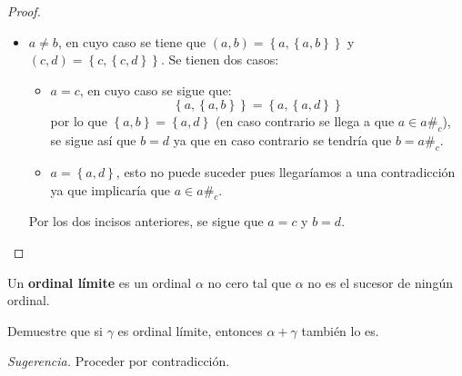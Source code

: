 \documentclass[12pt]{report}
\newcounter{it}
\theoremstyle{largebreak}
\newcommand\contradiction{\ensuremath{\#_c}}
\begin{document}
\begin{proof}
\begin{itemize}
            \item $a\neq b$, en cuyo caso se tiene que $(a,b)=\left\{a,\left\{a,b\right\}\right\}$ y $(c,d)=\left\{c,\left\{c,d\right\} \right\}$. Se tienen dos casos:
            \begin{itemize}
                \item $a=c$, en cuyo caso se sigue que:
                \begin{equation*}
                    \left\{a,\left\{a,b\right\}\right\}=\left\{a,\left\{a,d\right\} \right\}
                \end{equation*}
                por lo que $\left\{a,b\right\}=\left\{a,d \right\}$ (en caso contrario se llega a que $a\in a$\contradiction), se sigue así que $b=d$ ya que en caso contrario se tendría que $b=a$\contradiction.
                \item $a=\left\{a,d\right\}$, esto no puede suceder pues llegaríamos a una contradicción ya que implicaría que $a\in a$\contradiction.
            \end{itemize}
            Por los dos incisos anteriores, se sigue que $a=c$ y $b=d$.
        \end{itemize}
    \end{proof}

    \begin{excer}
        
    \end{excer}

    \begin{mydef}
        Un \textbf{ordinal límite} es un ordinal $\alpha$ no cero tal que $\alpha$ no es el sucesor de ningún ordinal.
    \end{mydef}

    \begin{excer}
        Demuestre que si $\gamma$ es ordinal límite, entonces $\alpha+\gamma$ también lo es.

        \textit{Sugerencia.} Proceder por contradicción.
    \end{excer}
\end{document}
